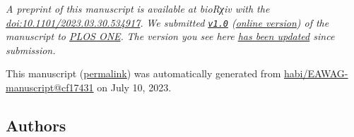 \emph{A preprint of this manuscript is available at bioRχiv with the \href{https://doi.org/10.1101/2023.03.30.534917}{doi:10.1101/2023.03.30.534917}.}
\emph{We submitted \href{https://github.com/habi/EAWAG-manuscript/releases/tag/v1.0}{\texttt{v1.0}} (\href{https://habi.github.io/EAWAG-manuscript/v/e1e2ef76a476174a4115937d77457037ddec95df/}{online version}) of the manuscript to \href{https://journals.plos.org/plosone/}{PLOS ONE}.}
\emph{The version you see here \href{https://github.com/habi/EAWAG-manuscript/compare/v1.0...cf174315484443289e3b288555f8ec832a6cc151}{has been updated} since submission.}

This manuscript
(\href{https://habi.github.io/EAWAG-manuscript/v/cf174315484443289e3b288555f8ec832a6cc151/}{permalink})
was automatically generated
from \href{https://github.com/habi/EAWAG-manuscript/tree/cf174315484443289e3b288555f8ec832a6cc151}{habi/EAWAG-manuscript@cf17431}
on July 10, 2023.

\hypertarget{authors}{%
\subsection{Authors}\label{authors}}

